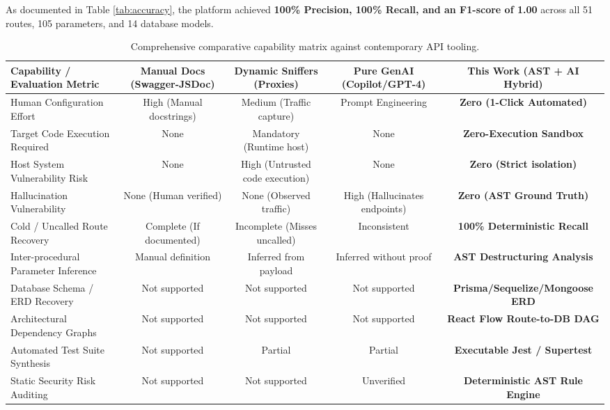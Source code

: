 \documentclass[a4paper,10pt]{article}
\begin{document}
As documented in Table \ref{tab:accuracy}, the platform achieved \textbf{100\% Precision, 100\% Recall, and an F1-score of 1.00} across all 51 routes, 105 parameters, and 14 database models.

\begin{table}[t]
\caption{Comprehensive comparative capability matrix against contemporary API tooling.}
\label{tab:comparison}
\centering
\fontsize{8pt}{10pt}\selectfont
\begin{tabular}{lcccc}
\toprule
\textbf{Capability / Evaluation Metric} & \textbf{Manual Docs (Swagger-JSDoc)} & \textbf{Dynamic Sniffers (Proxies)} & \textbf{Pure GenAI (Copilot/GPT-4)} & \textbf{This Work (AST + AI Hybrid)} \\
\midrule
Human Configuration Effort & High (Manual docstrings) & Medium (Traffic capture) & Prompt Engineering & \textbf{Zero (1-Click Automated)} \\
Target Code Execution Required & None & Mandatory (Runtime host) & None & \textbf{Zero-Execution Sandbox} \\
Host System Vulnerability Risk & None & High (Untrusted code execution) & None & \textbf{Zero (Strict isolation)} \\
Hallucination Vulnerability & None (Human verified) & None (Observed traffic) & High (Hallucinates endpoints) & \textbf{Zero (AST Ground Truth)} \\
Cold / Uncalled Route Recovery & Complete (If documented) & Incomplete (Misses uncalled) & Inconsistent & \textbf{100\% Deterministic Recall} \\
Inter-procedural Parameter Inference & Manual definition & Inferred from payload & Inferred without proof & \textbf{AST Destructuring Analysis} \\
Database Schema / ERD Recovery & Not supported & Not supported & Not supported & \textbf{Prisma/Sequelize/Mongoose ERD} \\
Architectural Dependency Graphs & Not supported & Not supported & Not supported & \textbf{React Flow Route-to-DB DAG} \\
Automated Test Suite Synthesis & Not supported & Partial & Partial & \textbf{Executable Jest / Supertest} \\
Static Security Risk Auditing & Not supported & Not supported & Unverified & \textbf{Deterministic AST Rule Engine} \\
\bottomrule
\end{tabular}
\end{table}
\end{document}
